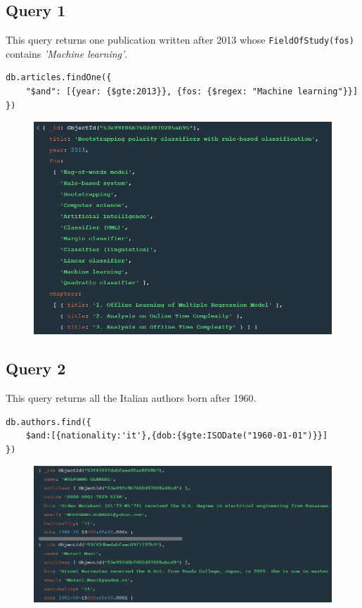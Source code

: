 \documentclass{Configuration_Files/PoliMi3i_thesis}
\begin{document}
\subsection{Query 1}
This query returns one publication written after 2013 whose \verb |FieldOfStudy(fos)| contains \emph{'Machine learning'}.
\begin{lstlisting}
db.articles.findOne({
	"$and": [{year: {$gte:2013}}, {fos: {$regex: "Machine learning"}}]
})
\end{lstlisting}
\begin{figure}[H]
\centering
\includegraphics[width=1\textwidth]{query/mongo_q1.PNG}
\label{fig:query1}
\end{figure}

\subsection{Query 2}
This query returns all the Italian authors born after 1960.
\begin{lstlisting}
db.authors.find({
	$and:[{nationality:'it'},{dob:{$gte:ISODate("1960-01-01")}}]
})
\end{lstlisting}
\begin{figure}[H]
\centering
\includegraphics[width=1\textwidth]{query/mongo_q2.PNG}
\label{fig:query2}
\end{figure}
\end{document}
